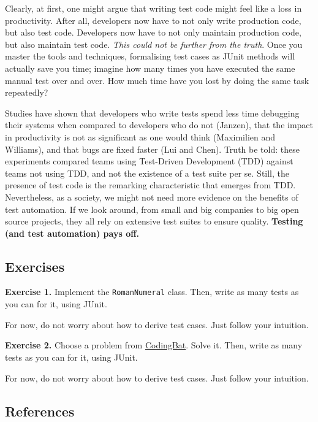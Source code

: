 Clearly, at first, one might argue that writing test code might feel
like a loss in productivity. After all, developers now have to not only
write production code, but also test code. Developers now have to not
only maintain production code, but also maintain test code. \emph{This
could not be further from the truth}. Once you master the tools and
techniques, formalising test cases as JUnit methods will actually save
you time; imagine how many times you have executed the same manual test
over and over. How much time have you lost by doing the same task
repeatedly?

Studies have shown that developers who write tests spend less time
debugging their systems when compared to developers who do not (Janzen),
that the impact in productivity is not as significant as one would think
(Maximilien and Williams), and that bugs are fixed faster (Lui and
Chen). Truth be told: these experiments compared teams using Test-Driven
Development (TDD) against teams not using TDD, and not the existence of
a test suite per se. Still, the presence of test code is the remarking
characteristic that emerges from TDD. Nevertheless, as a society, we
might not need more evidence on the benefits of test automation. If we
look around, from small and big companies to big open source projects,
they all rely on extensive test suites to ensure quality.
\textbf{Testing (and test automation) pays off.}

\hypertarget{exercises}{%
\subsection{Exercises}\label{exercises}}

\textbf{Exercise 1.} Implement the \texttt{RomanNumeral} class. Then,
write as many tests as you can for it, using JUnit.

For now, do not worry about how to derive test cases. Just follow your
intuition.

\textbf{Exercise 2.} Choose a problem from
\href{https://codingbat.com/java/Logic-2}{CodingBat}. Solve it. Then,
write as many tests as you can for it, using JUnit.

For now, do not worry about how to derive test cases. Just follow your
intuition.

\hypertarget{references}{%
\subsection{References}\label{references}}

